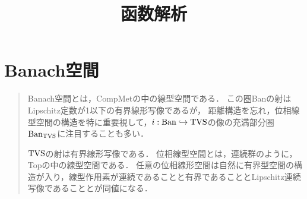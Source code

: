 \documentclass[uplatex,dvipdfmx]{jsreport}
\title{函数解析}
\author{}
\begin{document}
\tableofcontents

\chapter{Banach空間}

\begin{quotation}
    Banach空間とは，CompMetの中の線型空間である．
    この圏Banの射はLipschitz定数が1以下の有界線形写像であるが，
    距離構造を忘れ，位相線型空間の構造を特に重要視して，$i:\mathrm{Ban}\hookrightarrow\mathrm{TVS}$の像の充満部分圏$\mathrm{Ban}_{\mathrm{TVS}}$に注目することも多い．
    
    $\mathrm{TVS}$の射は有界線形写像である．
    位相線型空間とは，連続群のように，Topの中の線型空間である．
    任意の位相線形空間は自然に有界型空間の構造が入り，線型作用素が連続であることと有界であることとLipschitz連続写像であることとが同値になる．
\end{quotation}
\end{document}
